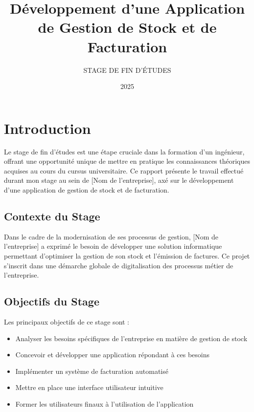 \documentclass{report}
\begin{document}
\title{Développement d'une Application de Gestion de Stock et de Facturation}
\author{STAGE DE FIN D'ÉTUDES}
\date{2025}

\maketitle

\tableofcontents

\chapter{Introduction}

Le stage de fin d'études est une étape cruciale dans la formation d'un ingénieur, offrant une opportunité unique de mettre en pratique les connaissances théoriques acquises au cours du cursus universitaire. Ce rapport présente le travail effectué durant mon stage au sein de [Nom de l'entreprise], axé sur le développement d'une application de gestion de stock et de facturation.

\section{Contexte du Stage}

Dans le cadre de la modernisation de ses processus de gestion, [Nom de l'entreprise] a exprimé le besoin de développer une solution informatique permettant d'optimiser la gestion de son stock et l'émission de factures. Ce projet s'inscrit dans une démarche globale de digitalisation des processus métier de l'entreprise.

\section{Objectifs du Stage}

Les principaux objectifs de ce stage sont :
\begin{itemize}
    \item Analyser les besoins spécifiques de l'entreprise en matière de gestion de stock
    \item Concevoir et développer une application répondant à ces besoins
    \item Implémenter un système de facturation automatisé
    \item Mettre en place une interface utilisateur intuitive
    \item Former les utilisateurs finaux à l'utilisation de l'application
\end{itemize}
\end{document}
